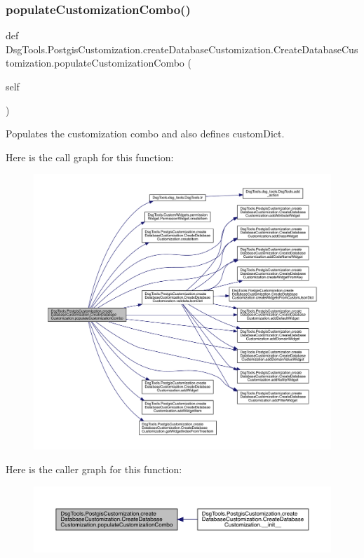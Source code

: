 \subsubsection{\texorpdfstring{populate\+Customization\+Combo()}{populateCustomizationCombo()}}
{\footnotesize\ttfamily def Dsg\+Tools.\+Postgis\+Customization.\+create\+Database\+Customization.\+Create\+Database\+Customization.\+populate\+Customization\+Combo (\begin{DoxyParamCaption}\item[{}]{self }\end{DoxyParamCaption})}

\begin{DoxyVerb}Populates the customization combo and also defines customDict.
\end{DoxyVerb}
 Here is the call graph for this function\+:
\nopagebreak
\begin{figure}[H]
\begin{center}
\leavevmode
\includegraphics[width=350pt]{class_dsg_tools_1_1_postgis_customization_1_1create_database_customization_1_1_create_database_customization_a17e6d9a84fda088744cf31b07897c324_cgraph}
\end{center}
\end{figure}
Here is the caller graph for this function\+:
\nopagebreak
\begin{figure}[H]
\begin{center}
\leavevmode
\includegraphics[width=350pt]{class_dsg_tools_1_1_postgis_customization_1_1create_database_customization_1_1_create_database_customization_a17e6d9a84fda088744cf31b07897c324_icgraph}
\end{center}
\end{figure}
